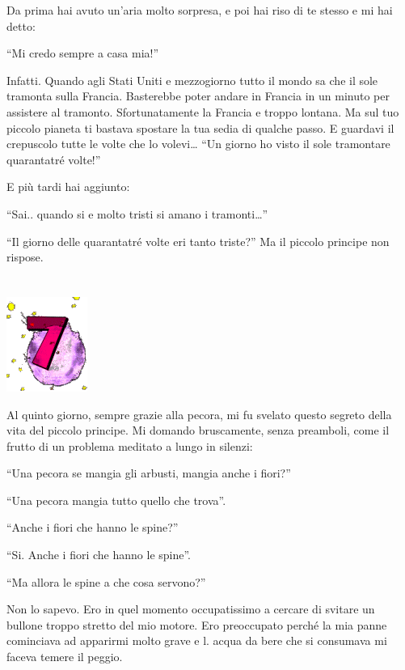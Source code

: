 \documentclass[11pt]{scrbook}
\begin{document}
Da prima hai avuto un'aria molto sorpresa, e poi hai riso di te stesso e
mi hai detto:

``Mi credo sempre a casa mia!''

Infatti. Quando agli Stati Uniti e mezzogiorno tutto il mondo sa che il
sole tramonta sulla Francia. Basterebbe poter andare in Francia in un
minuto per assistere al tramonto. Sfortunatamente la Francia e troppo
lontana. Ma sul tuo piccolo pianeta ti bastava spostare la tua sedia di
qualche passo. E guardavi il crepuscolo tutte le volte che lo
volevi\ldots{} ``Un giorno ho visto il sole tramontare quarantatré
volte!''

E più tardi hai aggiunto:

``Sai.. quando si e molto tristi si amano i tramonti\ldots{}''

``Il giorno delle quarantatré volte eri tanto triste?'' Ma il piccolo
principe non rispose.

\chapter{}
\begin{center}
\includegraphics{img/chapter7}
\end{center}

Al quinto giorno, sempre grazie alla pecora, mi fu svelato questo
segreto della vita del piccolo principe. Mi domando bruscamente, senza
preamboli, come il frutto di un problema meditato a lungo in silenzi:

``Una pecora se mangia gli arbusti, mangia anche i fiori?''

``Una pecora mangia tutto quello che trova''.

``Anche i fiori che hanno le spine?''

``Si. Anche i fiori che hanno le spine''.

``Ma allora le spine a che cosa servono?''

Non lo sapevo. Ero in quel momento occupatissimo a cercare di svitare un
bullone troppo stretto del mio motore. Ero preoccupato perché la mia
panne cominciava ad apparirmi molto grave e l. acqua da bere che si
consumava mi faceva temere il peggio.
\end{document}
